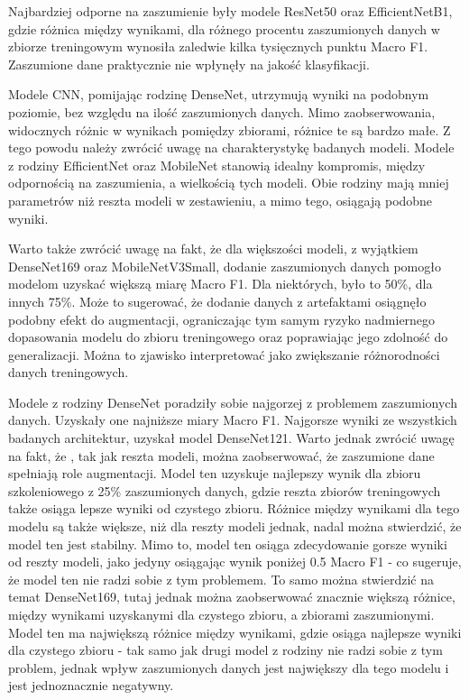 Najbardziej odporne na zaszumienie były modele ResNet50 oraz EfficientNetB1, gdzie różnica między wynikami, dla różnego procentu zaszumionych danych w zbiorze treningowym wynosiła zaledwie kilka tysięcznych punktu Macro F1. Zaszumione dane praktycznie nie wpłynęły na jakość klasyfikacji.

Modele CNN, pomijając rodzinę DenseNet, utrzymują wyniki na podobnym poziomie, bez względu na ilość zaszumionych danych. Mimo zaobserwowania, widocznych różnic \newline w wynikach pomiędzy zbiorami, różnice te są bardzo małe. Z tego powodu należy zwrócić uwagę na charakterystykę badanych modeli. Modele z rodziny EfficientNet oraz MobileNet stanowią idealny kompromis, między odpornością na zaszumienia, a wielkością tych modeli. Obie rodziny mają mniej parametrów niż reszta modeli w zestawieniu, a mimo tego, osiągają podobne wyniki.

Warto także zwrócić uwagę na fakt, że dla większości modeli, z wyjątkiem DenseNet169 oraz MobileNetV3Small, dodanie zaszumionych danych pomogło modelom uzyskać większą miarę Macro F1. Dla niektórych, było to 50\%, dla innych 75\%. Może to sugerować, że dodanie danych z artefaktami  osiągnęło podobny efekt  do augmentacji, ograniczając tym samym ryzyko nadmiernego dopasowania modelu do zbioru treningowego oraz poprawiając jego zdolność do generalizacji. Można to zjawisko interpretować jako zwiększanie różnorodności danych treningowych. 


Modele z rodziny DenseNet poradziły sobie najgorzej z problemem zaszumionych danych. Uzyskały one najniższe miary Macro F1. Najgorsze wyniki ze wszystkich badanych architektur, uzyskał model DenseNet121. Warto jednak zwrócić uwagę na fakt, że , tak jak reszta modeli, można zaobserwować, że zaszumione dane spełniają role augmentacji. Model ten uzyskuje najlepszy wynik dla zbioru szkoleniowego z 25\% zaszumionych danych, gdzie reszta zbiorów treningowych także osiąga lepsze wyniki od czystego zbioru. Różnice między wynikami dla tego modelu są także większe, niż dla reszty modeli jednak, nadal można stwierdzić, że model ten jest stabilny. Mimo to, model ten osiąga zdecydowanie gorsze wyniki od reszty modeli, jako jedyny osiągając wynik poniżej 0.5 Macro F1 - co sugeruje, że model ten nie radzi sobie z tym problemem. To samo można stwierdzić na temat DenseNet169, tutaj jednak można zaobserwować znacznie większą różnice, między wynikami uzyskanymi dla czystego zbioru, a zbiorami zaszumionymi. Model ten ma największą różnice między wynikami, gdzie osiąga najlepsze wyniki dla czystego zbioru - tak samo jak drugi model z rodziny nie radzi sobie z tym problem, jednak wpływ zaszumionych danych jest największy dla tego modelu i jest jednoznacznie negatywny.

